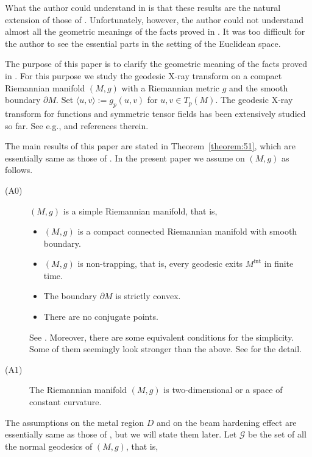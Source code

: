 \documentclass[a4paper,11pt,reqno]{amsart}
\numberwithin{equation}{section}
\theoremstyle{definition}
\theoremstyle{remark}
\begin{document}
%
%
What the author could understand in \cite{Chihara} is that these results are the natural extension of those of \cite{PalaciosUhlmannWang}. 
Unfortunately, however, the author could not understand almost all the geometric meanings of the facts proved in \cite{Chihara}. It was too difficult for the author to see the essential parts in the setting of the Euclidean space. 
%
%
\par
%
%
The purpose of this paper is to clarify the geometric meaning of the facts proved in \cite{Chihara}. For this purpose we study the geodesic X-ray transform on a compact Riemannian manifold $(M,g)$ with a Riemannian metric $g$ and the smooth boundary $\partial{M}$. 
Set $\langle{u,v}\rangle:=g_p(u,v)$ for $u,v \in T_p(M)$. 
The geodesic X-ray transform for functions and symmetric tensor fields 
has been extensively studied so far. 
See e.g.,\cite{FrigyikStefanovUhlmann,MonardStefanov,PaternainSaloUhlmann1,Quinto1,Quinto2,StefanovUhlmannVasy} and references therein. 
%
%
\par
%
%
The main results of this paper are stated in Theorem~\ref{theorem:51}, 
which are essentially same as those of \cite{Chihara}. 
In the present paper we assume on $(M,g)$ as follows. 
%
%
\begin{description}
\item[(A0)] 
$(M,g)$ is a simple Riemannian manifold, that is, 
%
%
\begin{itemize}
\item 
$(M,g)$ is a compact connected Riemannian manifold with smooth boundary. 
\item 
$(M,g)$ is non-trapping, that is, every geodesic exits $M^\text{int}$ in finite time. 
\item 
The boundary $\partial{M}$ is strictly convex.
\item 
There are no conjugate points.  
\end{itemize}
%
%
See \cite[Definition~3.8.1]{PaternainSaloUhlmann2}. 
Moreover, there are some equivalent conditions for the simplicity. 
Some of them seemingly look stronger than the above. 
See \cite[Theorem~3.8.2]{PaternainSaloUhlmann2} for the detail. 
\item[(A1)] 
The Riemannian manifold $(M,g)$ is two-dimensional or a space of constant curvature. 
\end{description}
%
%
The assumptions on the metal region $D$ and on the beam hardening effect are 
essentially same as those of \cite{ParkChoiSeo}, but we will state them later. 
Let $\mathcal{G}$ be the set of all the normal geodesics of $(M,g)$, that is, 
\end{document}
